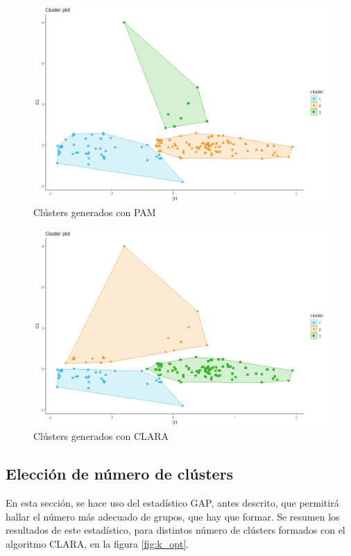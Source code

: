 \documentclass[12pt,oneside]{book}\usepackage[]{graphicx}\usepackage[]{color}
\theoremstyle{definition} %
\begin{document}
\begin{figure}[H]
\centering
\includegraphics[scale=0.45]{Resultados/1_Pamk3}
\caption{Clústers generados con PAM}\label{fig:pam}
\end{figure}


\begin{figure}[H]
\centering
\includegraphics[scale=0.45]{Resultados/1_Clarak3}
\caption{Clústers generados con CLARA }\label{fig:clara}
\end{figure}




\subsection{Elección de número de clústers}
En esta sección, se hace uso del estadístico GAP, antes descrito, que permitirá hallar el número más adecuado de grupos, que hay que formar. Se resumen los resultados de este estadístico, para distintos número de clústers formados con el algoritmo CLARA, en la figura \ref{fig:k_opt}.
\end{document}
